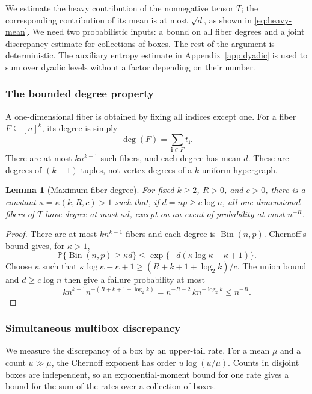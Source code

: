 \documentclass[11pt,reqno]{amsart}
\numberwithin{equation}{section}
\newtheorem{lemma}[theorem]{Lemma}
\theoremstyle{definition}
\theoremstyle{remark}
\newcommand{\Pp}{\mathbb P}
\begin{document}
We estimate the heavy contribution of the nonnegative tensor $T$;
the corresponding contribution of its mean is at most $\sqrt d$,
as shown in \eqref{eq:heavy-mean}. We need two probabilistic inputs:
a bound on all fiber degrees and a joint discrepancy estimate for
collections of boxes. The rest of the argument is deterministic.
The auxiliary entropy estimate in Appendix~\ref{app:dyadic} is used
to sum over dyadic levels without a factor depending on their number.

\subsubsection{The bounded degree property}\label{sec:degrees}

A one-dimensional fiber is obtained by fixing all indices except one.
For a fiber $F\subseteq[n]^k$, its degree is simply
\[
 \deg(F)=\sum_{\mathbf i\in F}t_{\mathbf i}.
\]
There are at most $kn^{k-1}$ such fibers, and each degree has mean $d$.
These are degrees of $(k-1)$-tuples, not vertex degrees of a
$k$-uniform hypergraph.
\begin{lemma}[Maximum fiber degree]\label{lem:fibers}
For fixed $k\ge2$, $R>0$, and $c>0$, there is a constant
$\kappa=\kappa(k,R,c)>1$ such that, if $d=np\ge c\log n$, all
one-dimensional fibers of $T$ have degree at most $\kappa d$,
except on an event of probability at most
$n^{-R}$.
\end{lemma}
\begin{proof}
There are at most $kn^{k-1}$ fibers and each degree is
$\operatorname{Bin}(n,p)$. Chernoff's bound gives, for $\kappa>1$,
\[
 \Pp\{\operatorname{Bin}(n,p)\ge\kappa d\}
 \le\exp\{-d(\kappa\log\kappa-\kappa+1)\}.
\]
Choose $\kappa$ such that
$\kappa\log\kappa-\kappa+1\ge (R+k+1+\log_2 k)/c$. The union bound and
$d\ge c\log n$ then give a failure probability at most
\[
 kn^{k-1}n^{-(R+k+1+\log_2 k)}
 =n^{-R-2}\,k n^{-\log_2 k}\le n^{-R}.
\]
\end{proof}

\subsubsection{Simultaneous multibox discrepancy}\label{sec:entropy}

We measure the discrepancy of a box by an upper-tail rate. For a
mean $\mu$ and a count $u\gg\mu$, the Chernoff exponent has order
$u\log(u/\mu)$. Counts in disjoint boxes are independent, so an
exponential-moment bound for one rate gives a bound for the sum of
the rates over a collection of boxes.
\end{document}
